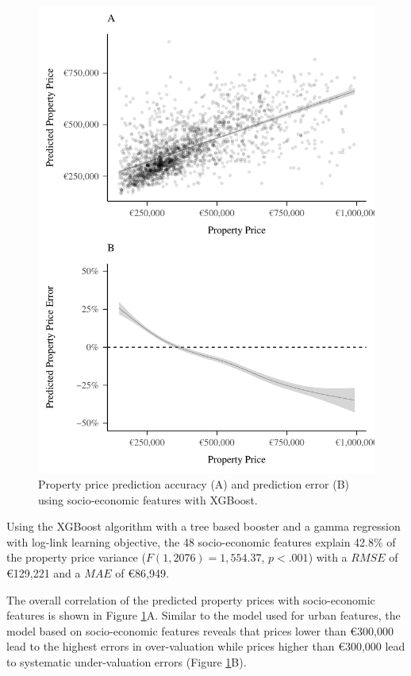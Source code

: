 \documentclass[conference,final,]{IEEEtran}
\begin{document}
\begin{figure}[!h]
\includegraphics[width=0.98\columnwidth]{manuscript_files/figure-latex/census-features-xgb-1} \caption{Property price prediction accuracy (A) and prediction error (B) using socio-economic features with XGBoost.}\label{fig:census-features-xgb}
\end{figure}

Using the XGBoost algorithm with a tree based booster and a gamma regression with log-link learning objective, the 48 socio-economic features explain 42.8\% of the property price variance (\(F(1, 2076) = 1,554.37\), \(p < .001\)) with a \(RMSE\) of €129,221 and a \(MAE\) of €86,949.

The overall correlation of the predicted property prices with socio-economic features is shown in Figure \ref{fig:census-features-xgb}A. Similar to the model used for urban features, the model based on socio-economic features reveals that prices lower than €300,000 lead to the highest errors in over-valuation while prices higher than €300,000 lead to systematic under-valuation errors (Figure \ref{fig:census-features-xgb}B).
\end{document}
